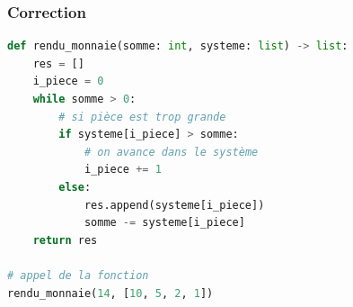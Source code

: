 \documentclass[svgnames,11pt]{beamer}
\begin{document}
\begin{frame}[fragile]
    \frametitle{Correction}

\begin{center}
\begin{lstlisting}[language=Python , basicstyle=\ttfamily\small, xleftmargin=.5em, xrightmargin=-1em]
def rendu_monnaie(somme: int, systeme: list) -> list:
    res = []
    i_piece = 0
    while somme > 0:
        # si pièce est trop grande
        if systeme[i_piece] > somme:
            # on avance dans le système
            i_piece += 1
        else:
            res.append(systeme[i_piece])
            somme -= systeme[i_piece]
    return res

# appel de la fonction
rendu_monnaie(14, [10, 5, 2, 1])
\end{lstlisting}
\end{center}    

\end{frame}
\end{document}
